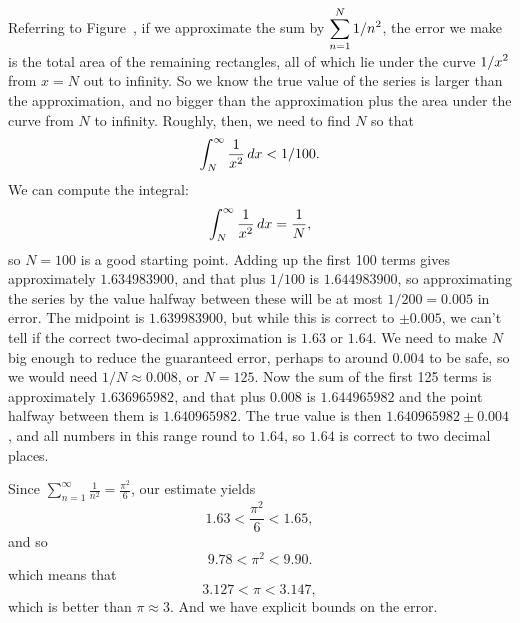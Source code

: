 
\begin{solution}
Referring to Figure~,
if we approximate the sum by $\displaystyle \sum_{n=1}^N 1/n^2$, the error we make is the
total area of the remaining rectangles, all of which lie under the
curve $\displaystyle 1/x^2$ from $x=N$ out to infinity. So we know the true value of
the series is larger than the approximation, and no bigger than the
approximation plus the area under the curve from $N$ to
infinity. Roughly, then, we need to find $N$ so that 
$$\int_N^\infty {1\over x^2}\,dx < 1/100.$$
We can compute the integral:
$$\int_N^\infty {1\over x^2}\,dx = {1\over N},$$ 
so $N=100$ is a good starting point.  Adding up the first 100 terms
gives approximately $1.634983900$, and that plus $1/100$ is
$1.644983900$, so approximating the series by the value halfway
between these will be at most $1/200=0.005$ in error.  The midpoint is
$1.639983900$, but while this is correct to $\pm0.005$, we can't tell
if the correct two-decimal approximation is $1.63$ or $1.64$. We need
to make $N$ big enough to reduce the guaranteed error, perhaps to
around $0.004$ to be safe, so we would need $1/N\approx 0.008$, or
$N=125$. Now the sum of the first 125 terms is approximately
$1.636965982$, and that plus $0.008$ is $1.644965982$ and the point
halfway between them is $1.640965982$. The true value is then
$1.640965982\pm 0.004$, and all numbers in this range round to $1.64$,
so $1.64$ is correct to two decimal places. 
\end{solution}

Since $\sum_{n=1}^\infty \frac{1}{n^2} = \frac{\pi^2}{6}$, our estimate yields
$$
1.63 < \frac{\pi^2}{6} < 1.65,
$$
and so
$$
9.78 < \pi^2 < 9.90.
$$
which means that
$$
3.127 < \pi < 3.147,
$$
which is better than $\pi \approx 3$.  And we have explicit bounds on the error.

